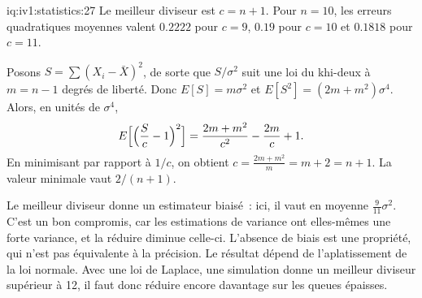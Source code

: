 \begin{solution}{iq:iv1:statistics:27}
Le meilleur diviseur est $c = n + 1$. Pour $n = 10$, les erreurs quadratiques moyennes valent $0.2222$ pour $c = 9$, $0.19$ pour $c = 10$ et $0.1818$ pour $c = 11$.

Posons $S = \sum(X_i - \bar{X})^2$, de sorte que $S/\sigma^2$ suit une loi du khi-deux à $m = n - 1$ degrés de liberté. Donc $E[S] = m\sigma^2$ et $E[S^2] = (2m + m^2)\sigma^4$. Alors, en unités de $\sigma^4$,
\[
E\Bigl[\Bigl(\frac{S}{c} - 1\Bigr)^2\Bigr] = \frac{2m + m^2}{c^2} - \frac{2m}{c} + 1.
\]
En minimisant par rapport à $1/c$, on obtient $c = \frac{2m + m^2}{m} = m + 2 = n + 1$. La valeur minimale vaut $2/(n + 1)$.

Le meilleur diviseur donne un estimateur biaisé~: ici, il vaut en moyenne $\frac{9}{11}\sigma^2$. C'est un bon compromis, car les estimations de variance ont elles-mêmes une forte variance, et la réduire diminue celle-ci. L'absence de biais est une propriété, qui n'est pas équivalente à la précision. Le résultat dépend de l'aplatissement de la loi normale. Avec une loi de Laplace, une simulation donne un meilleur diviseur supérieur à 12, il faut donc réduire encore davantage sur les queues épaisses.

\end{solution}

